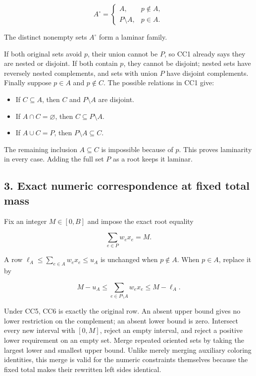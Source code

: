 \[
A^{\circ}=
\begin{cases}
A,&p\notin A,\\
P\setminus A,&p\in A.
\end{cases}
\tag{CC4}
\]

The distinct nonempty sets \(A^{\circ}\) form a laminar family.

If both original sets avoid \(p\), their union cannot be \(P\), so CC1 already says they are nested or disjoint. If both contain \(p\), they cannot be disjoint; nested sets have reversely nested complements, and sets with union \(P\) have disjoint complements. Finally suppose \(p\in A\) and \(p\notin C\). The possible relations in CC1 give:

\begin{itemize}
\tightlist
\item
  If \(C\subseteq A\), then \(C\) and \(P\setminus A\) are disjoint.
\item
  If \(A\cap C=\varnothing\), then \(C\subseteq P\setminus A\).
\item
  If \(A\cup C=P\), then \(P\setminus A\subseteq C\).
\end{itemize}

The remaining inclusion \(A\subseteq C\) is impossible because of \(p\). This proves laminarity in every case. Adding the full set \(P\) as a root keeps it laminar.

\hypertarget{af-3beb839889-exact-numeric-correspondence-at-fixed-total-mass}{%
\subsection{3. Exact numeric correspondence at fixed total mass}\label{af-3beb839889-exact-numeric-correspondence-at-fixed-total-mass}}

Fix an integer \(M\in[0,B]\) and impose the exact root equality

\[
\sum_{e\in P}w_e x_e=M.
\tag{CC5}
\]

A row \(\ell_A\le\sum_{e\in A}w_e x_e\le u_A\) is unchanged when \(p\notin A\). When \(p\in A\), replace it by

\[
M-u_A\le\sum_{e\in P\setminus A}w_e x_e\le M-\ell_A.
\tag{CC6}
\]

Under CC5, CC6 is exactly the original row. An absent upper bound gives no lower restriction on the complement; an absent lower bound is zero. Intersect every new interval with \([0,M]\), reject an empty interval, and reject a positive lower requirement on an empty set. Merge repeated oriented sets by taking the largest lower and smallest upper bound. Unlike merely merging auxiliary coloring identities, this merge is valid for the numeric constraints themselves because the fixed total makes their rewritten left sides identical.

